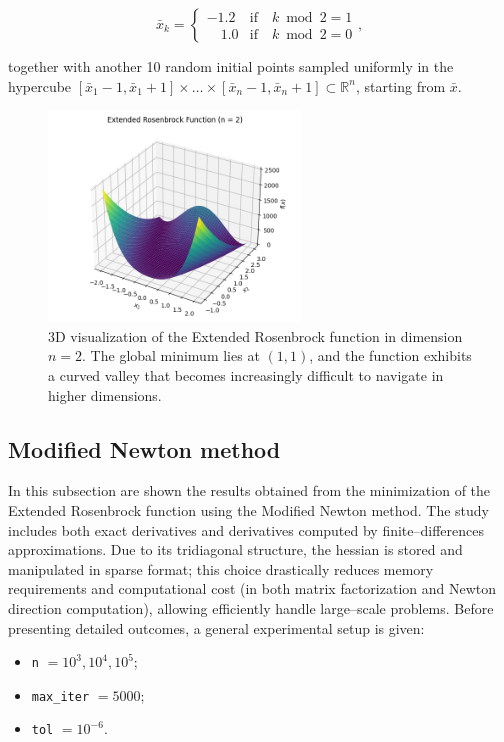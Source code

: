 \documentclass[a4paper,12pt]{article}
\begin{document}
		\begin{equation}
		\bar{x}_{k} =
		\begin{cases}
			-1.2 & \text{if} \quad k \bmod 2 = 1\\
			 \quad 1.0 & \text{if} \quad k \bmod 2 = 0
		\end{cases},
		\end{equation}
		
		 together with another 10 random initial points sampled uniformly in the hypercube $[\bar{x}_{1}-1,\bar{x}_{1}+1]\times\dots\times[\bar{x}_{n}-1,\bar{x}_{n}+1] \subset \mathbb{R}^{n}$, starting from $\bar{x}$.
	\newpage
	\begin{figure}[htbp]
		\centering
		\includegraphics[width=0.6\textwidth]{../immagini/ext_rosen_3d.png}
		\caption{3D visualization of the Extended Rosenbrock function in dimension $n=2$. The global minimum lies at $(1,1)$, and the function exhibits a curved valley that becomes increasingly difficult to navigate in higher dimensions.}
		\label{fig:extrosen3d}
	\end{figure}
	
	\subsection{Modified Newton method}
	In this subsection are shown the results obtained from the minimization of the Extended Rosenbrock function using the Modified Newton method. The study includes both exact derivatives and derivatives computed by finite--differences approximations. Due to its tridiagonal structure, the hessian is stored and manipulated in sparse format; this choice drastically reduces memory requirements and computational cost (in both matrix factorization and Newton direction computation), allowing efficiently handle large--scale problems. Before presenting detailed outcomes, a general experimental setup is given:
	\begin{itemize}
		\item \texttt{n} $= 10^{3},10^{4},10^{5}$;
		\item \texttt{max\_iter} $= 5000$;
		\item \texttt{tol} $= 10^{-6}$.
	\end{itemize}
	
\end{document}
